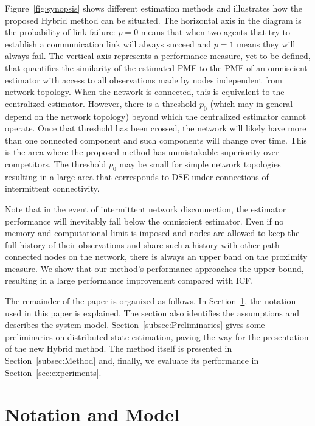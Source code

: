 \documentclass[journal]{IEEEtran}
\theoremstyle{remark}
\theoremstyle{definition}
\begin{document}
Figure~\ref{fig:synopsis} shows different estimation methods and illustrates
how the proposed Hybrid method can be situated.  The horizontal axis in the
diagram is the probability of link failure: $p=0$ means that when two agents
that try to establish a communication link will always succeed and $p=1$ means
they will always fail. The vertical axis represents a performance measure, yet
to be defined, that quantifies the similarity of the estimated PMF to the PMF
of an omniscient estimator with access to all observations made by nodes independent from
network topology.  When the network is connected, this is equivalent to the
centralized estimator.  However, there is a threshold $p_0$ (which may in general
depend on the network topology) beyond which the centralized estimator cannot
operate.  Once that threshold has been crossed, the network will likely have
more than one connected component and such components will change over time.
This is the area where the proposed method has unmistakable superiority over
competitors. The threshold $p_0$ may be small for simple network topologies
resulting in a large area that corresponds to DSE under connections of
intermittent connectivity.

Note that in the event of intermittent network disconnection, the estimator
performance will inevitably fall below the omniscient estimator. Even if no
memory and computational limit is imposed and nodes are allowed to keep the
full history of their observations and share such a history with other path
connected nodes on the network, there is always an upper band on the proximity
measure. We show that our method's performance approaches the upper bound,
resulting in a large performance improvement compared with ICF.  

The remainder of the paper is organized as follows.  In
Section~\ref{subsec:assump_not}, the notation used in this paper is explained.
The section also identifies the assumptions and describes the system model.
Section~\ref{subsec:Preliminaries} gives some preliminaries on distributed
state estimation, paving the way for the presentation of the new Hybrid method.
The method itself is presented in Section~\ref{subsec:Method} and, finally, we
evaluate its performance in Section~\ref{sec:experiments}.   

\section{Notation and Model} \label{subsec:assump_not}
\end{document}
